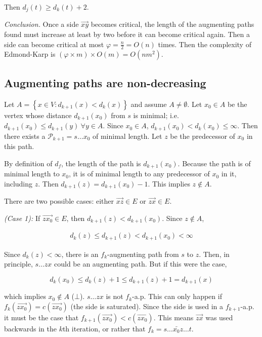 \documentclass[a4paper, 12pt]{article}
\begin{document}
Then $d_j(t) \geq d_k(t) + 2$.

\textit{Conclusion.} Once a side $\overrightarrow{xy}$ becomes 
critical, the length of the augmenting paths found 
must increase at least by two before it can become 
critical again. Then a side can become critical 
at most $\varphi = \frac{n}{2} = O(n)$ times. Then 
the complexity of Edmond-Karp is $(\varphi \times m) \times O(m) = O(nm^2)$.
    

\pagebreak 

\subsection{Augmenting paths are non-decreasing}

Let $A = \left\{ x \in V : d_{k+1}(x) < d_k(x) \right\} $ and
assume $A \neq \emptyset$. Let $x_0 \in A$ be the vertex whose distance
$d_{k+1}(x_0)$ from $s$ is minimal; i.e. $d_{k+1}(x_0) \leq d_{k+1}(y) ~
\forall y \in A$. Since $x_0 \in A$, $d_{k+1}(x_0) < d_k(x_0) \leq \infty$.
Then there exists a $\mathcal{P}_{k+1} = s \ldots x_0$ of minimal length.
Let $z$ be the predecessor of $x_0$ in this path.

By definition of $d_f$, the length of the path is $d_{k+1}(x_0)$. Because the
path is of minimal length to $x_0$, it is of minimal length to any predecessor
of $x_0$ in it, including $z$. Then $d_{k+1}(z) = d_{k+1}(x_0) - 1$. This
implies $z \not\in A$.

There are two possible cases: either $\overrightarrow{xz} \in E$
or $\overrightarrow{zx} \in E$.

\textit{(Case 1):} If $\overrightarrow{zx_0} \in E$, then
$d_{k+1}(z) < d_{k+1}(x_0)$. Since $z \not\in A$,

\begin{align*}
    d_k(z) \leq d_{k+1}(z) < d_{k+1}(x_0) < \infty
\end{align*}

Since $d_k(z) < \infty$, there is an $f_{k}$-augmenting path from $s$ to $z$.
Then, in principle, $s \ldots z x$ could be  an augmenting path. But
if this were the case, 

$$d_k(x_0) \leq d_k(z) + 1 \leq d_{k+1}(z) + 1 = d_{k+1}(x)$$ 

which implies $x_0 \not\in A$ ($\bot$). $s\ldots zx$ is not $f_k$-a.p. This can
only happen if $f_k(\overrightarrow{zx_0}) = c(\overrightarrow{zx_0})$ (the
side is saturated). Since the side is used in a $f_{k+1}$-a.p. it must be the
case that $f_{k+1}(\overrightarrow{zx_0}) < c(\overrightarrow{zx_0})$. This
means $\overrightarrow{zx}$ was used backwards in the $k$th iteration, or
rather that $f_k = s \ldots \overleftarrow{x_0z} \ldots t$.
\end{document}

